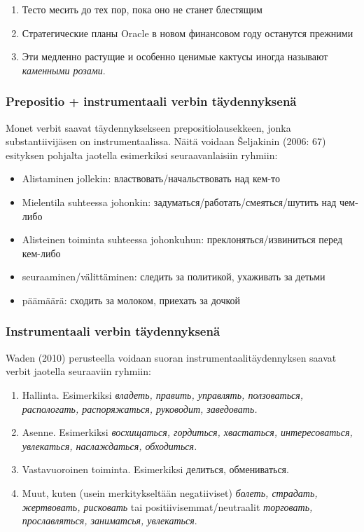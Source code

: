 \documentclass[]{scrartcl}
\providecommand{\tightlist}{%
  \setlength{\itemsep}{0pt}\setlength{\parskip}{0pt}}
\begin{document}
\begin{enumerate}
\def\labelenumi{(\arabic{enumi})}
\setcounter{enumi}{145}
\tightlist
\item
  Тесто месить до тех пор, пока оно не станет блестящим
\item
  Стратегические планы Oracle в новом финансовом году останутся прежними
\item
  Эти медленно растущие и особенно ценимые кактусы иногда называют
  \emph{каменными розами}.
\end{enumerate}

\subsubsection{Prepositio + instrumentaali verbin
täydennyksenä}\label{prepositio-instrumentaali-verbin-tuxe4ydennyksenuxe4}

Monet verbit saavat täydennyksekseen prepositiolausekkeen, jonka
substantiivijäsen on instrumentaalissa. Näitä voidaan Šeljakinin (2006:
67) esityksen pohjalta jaotella esimerkiksi seuraavanlaisiin ryhmiin:

\begin{itemize}
\tightlist
\item
  Alistaminen jollekin: властвовать/начальствовать над кем-то
\item
  Mielentila suhteessa johonkin: задуматься/работать/смеяться/шутить над
  чем-либо
\item
  Alisteinen toiminta suhteessa johonkuhun: преклоняться/извиниться
  перед кем-либо
\item
  seuraaminen/välittäminen: следить за политикой, ухаживать за детьми
\item
  päämäärä: сходить за молоком, приехать за дочкой
\end{itemize}

\subsubsection{Instrumentaali verbin
täydennyksenä}\label{instrumentaali-verbin-tuxe4ydennyksenuxe4}

Waden (2010) perusteella voidaan suoran instrumentaalitäydennyksen
saavat verbit jaotella seuraaviin ryhmiin:

\begin{enumerate}
\def\labelenumi{\arabic{enumi}.}
\tightlist
\item
  Hallinta. Esimerkiksi \emph{владеть, править, управлять, ползоваться,
  распологать, распоряжаться, руководит, заведовать.}
\item
  Asenne. Esimerkiksi \emph{восхищаться, гордиться, хвастаться,
  интересоваться, увлекаться, наслаждаться, обходиться.}
\item
  Vastavuoroinen toiminta. Esimerkiksi делиться, обмениваться.
\item
  Muut, kuten (usein merkitykseltään negatiiviset) \emph{болеть,
  страдать, жертвовать, рисковать} tai positiivisemmat/neutraalit
  \emph{торговать, прославляться, заниматсья, увлекаться}.
\end{enumerate}
\end{document}
